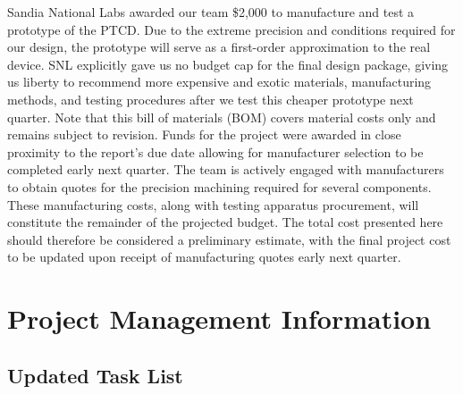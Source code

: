 \documentclass[12pt, letterpaper]{report}%
\newcounter{mycounter}           %
\newcounter{sub}[mycounter]      %
\newcommand{\device}{PTCD}
\begin{document}
    Sandia National Labs awarded our team \$2,000 to manufacture and test a prototype of the \device.
    Due to the extreme precision and conditions required for our design, the prototype will serve as a first-order approximation to the real device.
    SNL explicitly gave us no budget cap for the final design package, giving us liberty to recommend more expensive and exotic materials, manufacturing methods, and testing procedures after we test this cheaper prototype next quarter.
    Note that this bill of materials (BOM) covers material costs only and remains subject to revision. Funds for the project were awarded in close proximity to the report's due date allowing for manufacturer selection to be completed early next quarter. The team is actively engaged with manufacturers to obtain quotes for the precision machining required for several components. 
    These manufacturing costs, along with testing apparatus procurement, will constitute the remainder of the projected budget. The total cost presented here should therefore be considered a preliminary estimate, with the final project 
    cost to be updated upon receipt of manufacturing quotes early next quarter.

    
    \label{fig:bom}




%
%

\chapter{Project Management Information}
\label{sec:project_management}


\section{Updated Task List}
\label{subsec:task_list}
\end{document}
